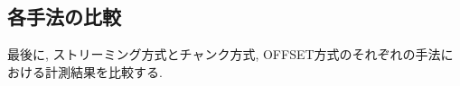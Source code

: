 \documentclass[../../../main]{subfiles}
\begin{document}
    \subsection{各手法の比較}\label{subsec:result-each-way}

    最後に, ストリーミング方式とチャンク方式, OFFSET方式のそれぞれの手法における計測結果を比較する.

    
    
\end{document}

